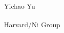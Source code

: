 \documentclass{beamer}
\begin{document}
\begin{frame}[t]{}
\begin{columns}[t]
{    }
    \column{4cm}
    \begin{center}
      {\large{Yichao Yu}}\\
      {\small{\@date}}\\
      {\small{Harvard/Ni Group}}
    \end{center}
  \end{columns}
\end{frame}
\makeatother


\end{document}
